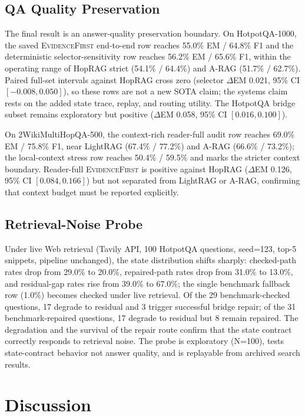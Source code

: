 \documentclass[runningheads,a4paper]{llncs}
\newcommand{\sys}{\textsc{EvidenceFirst}\xspace}
\begin{document}
\subsection{QA Quality Preservation}

The final result is an answer-quality preservation boundary. On HotpotQA-1000,
the saved \sys end-to-end row reaches 55.0\% EM / 64.8\% F1 and the deterministic
selector-sensitivity row reaches 56.2\% EM / 65.6\% F1, within the operating
range of HopRAG strict (54.1\% / 64.4\%) and A-RAG (51.7\% / 62.7\%). Paired
full-set intervals against HopRAG cross zero (selector $\Delta$EM 0.021, 95\%
CI $[-0.008,0.050]$), so these rows are not a new SOTA claim; the systems claim
rests on the added state trace, replay, and routing utility. The HotpotQA bridge
subset remains exploratory but positive ($\Delta$EM 0.058, 95\% CI
$[0.016,0.100]$).

On 2WikiMultiHopQA-500, the context-rich reader-full audit row reaches 69.0\%
EM / 75.8\% F1, near LightRAG (67.4\% / 77.2\%) and A-RAG (66.6\% / 73.2\%);
the local-context stress row reaches 50.4\% / 59.5\% and marks the stricter
context boundary. Reader-full \sys is positive against HopRAG ($\Delta$EM
0.126, 95\% CI $[0.084,0.166]$) but not separated from LightRAG or A-RAG,
confirming that context budget must be reported explicitly.

\subsection{Retrieval-Noise Probe}

Under live Web retrieval (Tavily API, 100 HotpotQA questions, seed=123,
top-5 snippets, pipeline unchanged), the state distribution shifts sharply:
checked-path rates drop from 29.0\% to 20.0\%, repaired-path rates drop from
31.0\% to 13.0\%, and residual-gap rates rise from 39.0\% to 67.0\%; the
single benchmark fallback row (1.0\%) becomes checked under live retrieval.
Of the 29 benchmark-checked questions, 17 degrade to residual and 3 trigger
successful bridge repair; of the 31 benchmark-repaired questions, 17 degrade
to residual but 8 remain repaired. The degradation and the survival of the
repair route confirm that the state contract correctly responds to retrieval
noise. The probe is exploratory (N=100), tests state-contract behavior not
answer quality, and is replayable from archived search results.

\section{Discussion}
\label{sec:discussion}
\end{document}
